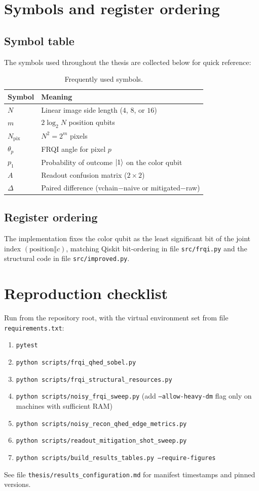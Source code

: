 \chapter{Symbols and register ordering}

\section{Symbol table}
The symbols used throughout the thesis are collected below for quick reference:
\begin{table}[htbp]
\centering
\caption{Frequently used symbols.}
\begin{tabular}{ll}
\toprule
Symbol & Meaning \\
\midrule
$N$ & Linear image side length ($4$, $8$, or $16$) \\
$m$ & $2\log_2 N$ position qubits \\
$N_{\mathrm{pix}}$ & $N^2=2^m$ pixels \\
$\theta_p$ & FRQI angle for pixel $p$ \\
$p_1$ & Probability of outcome $\ket{1}$ on the color qubit \\
$A$ & Readout confusion matrix ($2\times 2$) \\
$\Delta$ & Paired difference (vchain$-$naive or mitigated$-$raw) \\
\bottomrule
\end{tabular}
\end{table}

\section{Register ordering}
The implementation fixes the color qubit as the least significant bit of the joint index $(\mathrm{position}\Vert c)$, matching Qiskit bit-ordering in file \texttt{src/frqi.py} and the structural code in file \texttt{src/improved.py}.

\chapter{Reproduction checklist}

Run from the repository root, with the virtual environment set from file \texttt{requirements.txt}:
\begin{enumerate}
  \item \texttt{pytest}
  \item \texttt{python scripts/frqi\_qhed\_sobel.py}
  \item \texttt{python scripts/frqi\_structural\_resources.py}
  \item \texttt{python scripts/noisy\_frqi\_sweep.py} (add \texttt{---allow-heavy-dm} flag only on machines with sufficient RAM)
  \item \texttt{python scripts/noisy\_recon\_qhed\_edge\_metrics.py}
  \item \texttt{python scripts/readout\_mitigation\_shot\_sweep.py}
  \item \texttt{python scripts/build\_results\_tables.py ---require-figures}
\end{enumerate}
See file \texttt{thesis/results\_configuration.md} for manifest timestamps and pinned versions.


